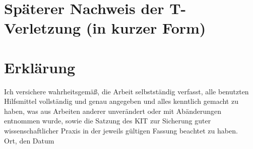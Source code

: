 \documentclass[12pt,a4paper]{scrartcl}
\numberwithin{equation}{section}
\begin{document}
  \newpage  %

  \section{Späterer Nachweis der T-Verletzung (in kurzer Form)}

  \newpage

\begin{thebibliography}{Lam00}

\end{thebibliography}



\newpage

 \thispagestyle{empty}


\vspace*{8cm}


\section*{Erklärung}

Ich  versichere  wahrheitsgemäß,  die  Arbeit selbstständig verfasst,  alle  benutzten  Hilfsmittel  vollständig  und  genau  angegeben  und  alles kenntlich  gemacht  zu  haben,  was  aus  Arbeiten  anderer  unverändert  oder  mit  Abänderungen entnommen  wurde,  sowie die Satzung  des  KIT  zur  Sicherung guter wissenschaftlicher Praxis in der jeweils gültigen Fassung beachtet zu haben.
\\[2ex]

\noindent
Ort, den Datum\\[5ex]

\end{document}
